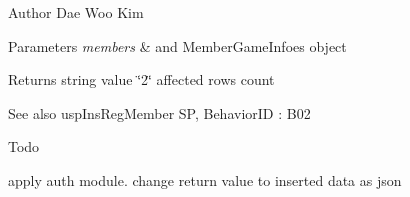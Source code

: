\begin{DoxyAuthor}{Author}
Dae Woo Kim 
\end{DoxyAuthor}

\begin{DoxyParams}{Parameters}
{\em members} & and Member\+Game\+Infoes object \\
\hline
\end{DoxyParams}
\begin{DoxyReturn}{Returns}
string value \char`\"{}2\char`\"{} affected rows count 
\end{DoxyReturn}
\begin{DoxySeeAlso}{See also}
usp\+Ins\+Reg\+Member SP, Behavior\+ID \+: B02 
\end{DoxySeeAlso}
\begin{DoxyRefDesc}{Todo}
\item[\hyperlink{a00001__todo000006}{Todo}]apply auth module. change return value to inserted data as json \end{DoxyRefDesc}
